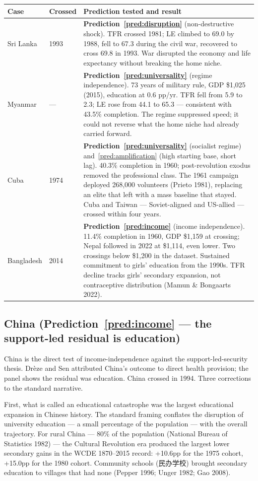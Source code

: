 \documentclass[12pt,letterpaper]{article}
\begin{document}
\begin{longtable}[]{@{}llp{}@{}}
\toprule
Case & Crossed & Prediction tested and result \\
\midrule
\endhead
Sri Lanka & 1993 & \textbf{Prediction~\ref{pred:disruption}} (non-destructive shock). TFR crossed 1981; LE climbed to 69.0 by 1988, fell to 67.3 during the civil war, recovered to cross 69.8 in 1993. War disrupted the economy and life expectancy without breaking the home niche. \\
Myanmar & --- & \textbf{Prediction~\ref{pred:universality}} (regime independence). 73 years of military rule, GDP \$1,025 (2015), education at 0.6 pp/yr. TFR fell from 5.9 to 2.3; LE rose from 44.1 to 65.3 --- consistent with 43.5\% completion. The regime suppressed speed; it could not reverse what the home niche had already carried forward. \\
Cuba & 1974 & \textbf{Prediction~\ref{pred:universality}} (socialist regime) and~\ref{pred:amplification} (high starting base, short lag). 40.3\% completion in 1960; post-revolution exodus removed the professional class. The 1961 campaign deployed 268,000 volunteers (Prieto 1981), replacing an elite that left with a mass baseline that stayed. Cuba and Taiwan --- Soviet-aligned and US-allied --- crossed within four years. \\
Bangladesh & 2014 & \textbf{Prediction~\ref{pred:income}} (income independence). 11.4\% completion in 1960, GDP \$1,159 at crossing; Nepal followed in 2022 at \$1,114, even lower. Two crossings below \$1,200 in the dataset. Sustained commitment to girls' education from the 1990s. TFR decline tracks girls' secondary expansion, not contraceptive distribution (Mamun \& Bongaarts 2022). \\
\bottomrule
\end{longtable}

\subsection{China (Prediction~\ref{pred:income} --- the support-led residual is education)}\label{china}

China is the direct test of income-independence against the
support-led-security thesis. Drèze and Sen attributed China's outcome
to direct health provision; the panel shows the residual was
education. China crossed in 1994. Three corrections to the standard
narrative.

First, what is called an educational catastrophe was
the largest educational expansion in Chinese history. The standard
framing conflates the disruption of university education --- a
small percentage of the population --- with the overall
trajectory. For rural China --- 80\% of the population
(National Bureau of Statistics 1982) --- the Cultural Revolution era
produced the largest lower secondary gains in the WCDE
1870--2015 record: +10.6pp for the 1975 cohort, +15.0pp for the 1980
cohort. Community schools (民办学校) brought secondary
education to villages that had none (Pepper 1996; Unger 1982; Gao 2008).
\end{document}
